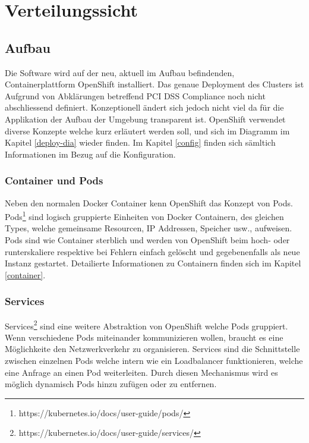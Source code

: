 \graphicspath{{./images/}}

\chapter{Verteilungssicht}
\label{deploy}

\section{Aufbau}
Die Software wird auf der neu, aktuell im Aufbau befindenden, Containerplattform OpenShift installiert. Das genaue Deployment des Clusters ist Aufgrund von Abklärungen betreffend PCI DSS Compliance noch nicht abschliessend definiert. Konzeptionell ändert sich jedoch nicht viel da für die Applikation der Aufbau der Umgebung transparent ist.
OpenShift verwendet diverse Konzepte welche kurz erläutert werden soll, und sich im Diagramm im Kapitel \ref{deploy-dia} wieder finden. Im Kapitel \ref{config} finden sich sämltich Informationen im Bezug auf die Konfiguration.

\subsection{Container und Pods}

Neben den normalen Docker Container kenn OpenShift das Konzept von Pods. Pods\footnote{https://kubernetes.io/docs/user-guide/pods/} sind logisch gruppierte Einheiten von Docker Containern, des gleichen Types, welche gemeinsame Resourcen, IP Addressen, Speicher usw.,  aufweisen. Pods sind wie Container sterblich und werden von OpenShift beim hoch- oder runterskaliere respektive bei Fehlern einfach gelöscht und gegebenenfalls als neue Instanz gestartet. Detailierte Informationen zu Containern finden sich im Kapitel \ref{container}.

\subsection{Services}

Services\footnote{https://kubernetes.io/docs/user-guide/services/} sind eine weitere Abstraktion von OpenShift welche Pods gruppiert. Wenn verschiedene Pods miteinander kommunizieren wollen, braucht es eine Möglichkeite den Netzwerkverkehr zu organisieren. Services sind die Schnittstelle zwischen einzelnen Pods welche intern wie ein Loadbalancer funktionieren, welche eine Anfrage an einen Pod weiterleiten. Durch diesen Mechanismus wird es möglich dynamisch Pods hinzu zufügen oder zu entfernen.


